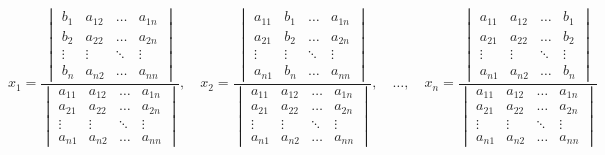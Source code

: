 \[ x_1 = \frac{
            \begin{vmatrix}
                b_{1} & a_{12} & \ldots & a_{1n} \\    
                b_{2} & a_{22} & \ldots & a_{2n} \\
                \vdots & \vdots& \ddots & \vdots \\
                b_{n} & a_{n2} & \ldots & a_{nn} 
            \end{vmatrix} 
}{
            \begin{vmatrix}
                a_{11} & a_{12} & \ldots & a_{1n} \\    
                a_{21} & a_{22} & \ldots & a_{2n} \\
                \vdots & \vdots & \ddots & \vdots \\
                a_{n1} & a_{n2} & \ldots & a_{nn} 
            \end{vmatrix} 
}, \quad
x_2 = \frac{
            \begin{vmatrix}
                a_{11} & b_{1}  & \ldots & a_{1n} \\    
                a_{21} & b_{2}  & \ldots & a_{2n} \\
                \vdots & \vdots & \ddots & \vdots \\
                a_{n1} & b_{n}  & \ldots & a_{nn} 
            \end{vmatrix} 
}{
            \begin{vmatrix}
                a_{11} & a_{12} & \ldots & a_{1n} \\    
                a_{21} & a_{22} & \ldots & a_{2n} \\
                \vdots & \vdots & \ddots & \vdots \\
                a_{n1} & a_{n2} & \ldots & a_{nn} 
            \end{vmatrix} 
}, \quad \ldots, \quad x_n = \frac{
            \begin{vmatrix}
                a_{11} & a_{12}  & \ldots & b_{1} \\    
                a_{21} & a_{22}  & \ldots & b_{2} \\
                \vdots & \vdots  & \ddots & \vdots \\
                a_{n1} & a_{n2}  & \ldots & b_{n} 
            \end{vmatrix} 
}{
            \begin{vmatrix}
                a_{11} & a_{12} & \ldots & a_{1n} \\    
                a_{21} & a_{22} & \ldots & a_{2n} \\
                \vdots & \vdots & \ddots & \vdots \\
                a_{n1} & a_{n2} & \ldots & a_{nn} 
            \end{vmatrix} 
}
\]

